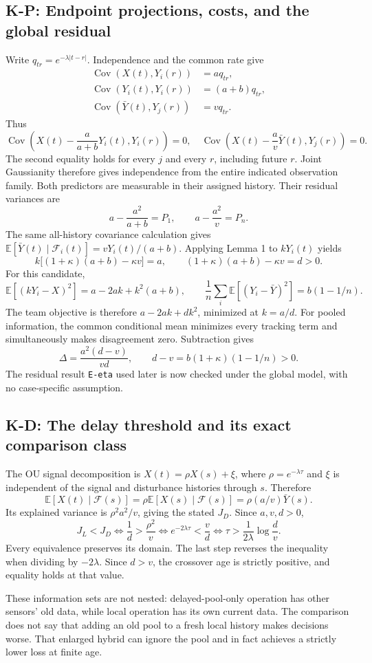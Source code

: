 \documentclass[11pt,letterpaper]{article}
\newcommand{\E}{\mathbb E}
\newcommand{\Cov}{\operatorname{Cov}}
\newcommand{\F}{\mathcal F}
\newcommand{\calculation}[2]{\subsection{#1: #2}}
\begin{document}
\calculation{K-P}{Endpoint projections, costs, and the global residual}
Write $q_{tr}=e^{-\lambda|t-r|}$. Independence and the common rate give
\begin{align*}
\Cov(X(t),Y_i(r))&=a q_{tr},\\
\Cov(Y_i(t),Y_i(r))&=(a+b)q_{tr},\\
\Cov(\bar Y(t),Y_j(r))&=v q_{tr}.
\end{align*}
Thus
\[
\Cov\left(X(t)-\frac{a}{a+b}Y_i(t),Y_i(r)\right)=0,
\quad
\Cov\left(X(t)-\frac av\bar Y(t),Y_j(r)\right)=0.
\]
The second equality holds for every $j$ and every $r$, including future $r$. Joint Gaussianity therefore gives independence from the entire indicated observation family. Both predictors are measurable in their assigned history. Their residual variances are
\[
a-\frac{a^2}{a+b}=P_1,\qquad a-\frac{a^2}{v}=P_n.
\]
The same all-history covariance calculation gives
$\E[\bar Y(t)\mid\F_i(t)]=vY_i(t)/(a+b)$. Applying Lemma 1 to $kY_i(t)$ yields
\[
k\bigl[(1+\kappa)(a+b)-\kappa v\bigr]=a,
\qquad (1+\kappa)(a+b)-\kappa v=d>0.
\]
For this candidate,
\[
\E[(kY_i-X)^2]=a-2ak+k^2(a+b),\qquad
\frac1n\sum_i\E[(Y_i-\bar Y)^2]=b(1-1/n).
\]
The team objective is therefore $a-2ak+dk^2$, minimized at $k=a/d$. For pooled information, the common conditional mean minimizes every tracking term and simultaneously makes disagreement zero. Subtraction gives
\[
\Delta=\frac{a^2(d-v)}{vd},\qquad d-v=b(1+\kappa)(1-1/n)>0.
\]
The residual result \texttt{E-eta} used later is now checked under the global model, with no case-specific assumption.

\calculation{K-D}{The delay threshold and its exact comparison class}
The OU signal decomposition is $X(t)=\rho X(s)+\xi$, where $\rho=e^{-\lambda\tau}$ and $\xi$ is independent of the signal and disturbance histories through $s$. Therefore
\[
\E[X(t)\mid\F(s)]=\rho\E[X(s)\mid\F(s)]=\rho(a/v)\bar Y(s).
\]
Its explained variance is $\rho^2a^2/v$, giving the stated $J_D$. Since $a,v,d>0$,
\[
J_L<J_D\iff \frac1d>\frac{\rho^2}{v}
\iff e^{-2\lambda\tau}<\frac vd
\iff \tau>\frac{1}{2\lambda}\log\frac dv.
\]
Every equivalence preserves its domain. The last step reverses the inequality when dividing by $-2\lambda$. Since $d>v$, the crossover age is strictly positive, and equality holds at that value.

These information sets are not nested: delayed-pool-only operation has other sensors' old data, while local operation has its own current data. The comparison does not say that adding an old pool to a fresh local history makes decisions worse. That enlarged hybrid can ignore the pool and in fact achieves a strictly lower loss at finite age.
\end{document}
